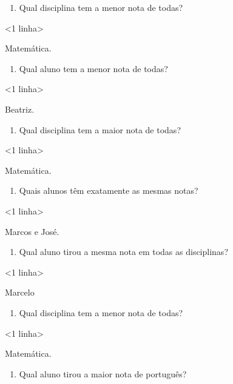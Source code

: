 \begin{enumerate}
\def\labelenumi{\alph{enumi})}
\item
  Qual disciplina tem a menor nota de todas?
\end{enumerate}

\textless{}1 linha\textgreater{}

Matemática.

\begin{enumerate}
\def\labelenumi{\alph{enumi})}
\item
  Qual aluno tem a menor nota de todas?
\end{enumerate}

\textless{}1 linha\textgreater{}

Beatriz.

\begin{enumerate}
\def\labelenumi{\alph{enumi})}
\item
  Qual disciplina tem a maior nota de todas?
\end{enumerate}

\textless{}1 linha\textgreater{}

Matemática.

\begin{enumerate}
\def\labelenumi{\alph{enumi})}
\item
  Quais alunos têm exatamente as mesmas notas?
\end{enumerate}

\textless{}1 linha\textgreater{}

Marcos e José.

\begin{enumerate}
\def\labelenumi{\alph{enumi})}
\item
  Qual aluno tirou a mesma nota em todas as disciplinas?
\end{enumerate}

\textless{}1 linha\textgreater{}

Marcelo

\begin{enumerate}
\def\labelenumi{\alph{enumi})}
\item
  Qual disciplina tem a menor nota de todas?
\end{enumerate}

\textless{}1 linha\textgreater{}

Matemática.

\begin{enumerate}
\def\labelenumi{\alph{enumi})}
\item
  Qual aluno tirou a maior nota de português?
\end{enumerate}

